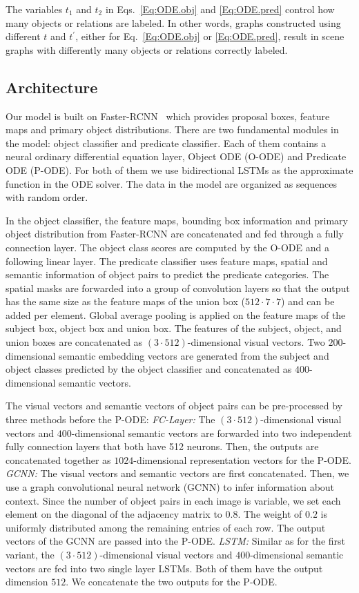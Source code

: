 \documentclass[runningheads]{llncs}
\begin{document}
The variables $t_1$ and $t_2$ in Eqs.~\eqref{Eq:ODE.obj} and \eqref{Eq:ODE.pred} control how many objects or relations are labeled. In other words, graphs constructed using different $t$ and $t^\prime$, either for Eq.~\eqref{Eq:ODE.obj} or \eqref{Eq:ODE.pred}, result in scene graphs with differently many objects or relations correctly labeled. 


\subsection{Architecture}
\label{Sec:Archi}
Our model is built on Faster-RCNN~\cite{ren2015faster} which provides proposal boxes, feature maps and primary object distributions. There are two fundamental modules in the model: object classifier and predicate classifier. Each of them contains a neural ordinary differential equation layer, Object ODE (O-ODE) and Predicate ODE (P-ODE). For both of them we use bidirectional LSTMs as the approximate function in the ODE solver. The data in the model are organized as sequences with random order.

In the object classifier, the feature maps, bounding box information and primary object distribution from Faster-RCNN are concatenated and fed through a fully connection layer. The object class scores are computed by the O-ODE and a following linear layer. The predicate classifier uses feature maps, spatial and semantic information of object pairs to predict the predicate categories. 
The spatial masks are forwarded into a group of convolution layers so that the output has the same size as the feature maps of the union box ($512 \cdot 7 \cdot 7$) and can be added per element. Global average pooling is applied on the feature maps of the subject box, object box and union box. The features of the subject, object, and union boxes are concatenated as  $(3 \cdot 512)$-dimensional visual vectors. Two $200$-dimensional semantic embedding vectors are generated from the subject and object classes predicted by the object classifier and concatenated as $400$-dimensional semantic vectors. 

The visual vectors and semantic vectors of object pairs can be pre-processed by three methods before the P-ODE:  \emph{FC-Layer:} The $(3 \cdot 512)$-dimensional visual vectors and $400$-dimensional semantic vectors are forwarded into two independent fully connection layers that both have 512 neurons. Then, the outputs are concatenated together as $1024$-dimensional representation vectors for the P-ODE. \emph{GCNN:} The visual vectors and semantic vectors are first concatenated. Then, we use a graph convolutional neural network (GCNN) to infer information about context. Since the number of object pairs in each image is variable, we set each element on the diagonal of the adjacency matrix to $0.8$. The weight of $0.2$ is uniformly distributed among the remaining entries of each row. The output vectors of the GCNN are passed into the P-ODE. \emph{LSTM:} Similar as for the first variant, the $(3 \cdot 512)$-dimensional visual vectors and $400$-dimensional semantic vectors are fed into two single layer LSTMs. Both of them have the output dimension $512$. We concatenate the two outputs for the P-ODE. 
\end{document}
